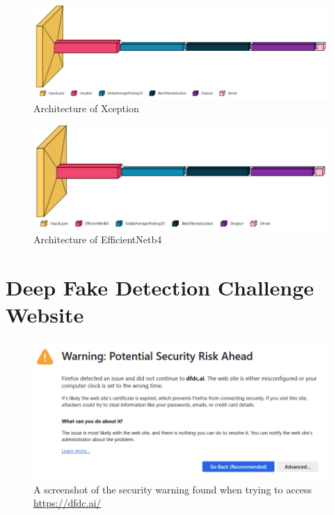 \begin{figure}[H]
    \centering
    \includegraphics[width=1\linewidth]{dissertation//figures/xception.png}
    \caption{Architecture of Xception}
\end{figure}

\begin{figure}[H]
    \centering
    \includegraphics[width=1\linewidth]{dissertation//figures/efficientnet.png}
    \caption{Architecture of EfficientNetb4}
\end{figure}

\chapter{Deep Fake Detection Challenge Website}
\label{ch:dfdcai}

\begin{figure}[h]
    \centering
    \includegraphics[width=1\linewidth]{dissertation//figures/dfdc.png}
    \caption{A screenshot of the security warning found when trying to access \url{https://dfdc.ai/}}
    \label{fig:dfdcai}
\end{figure}

